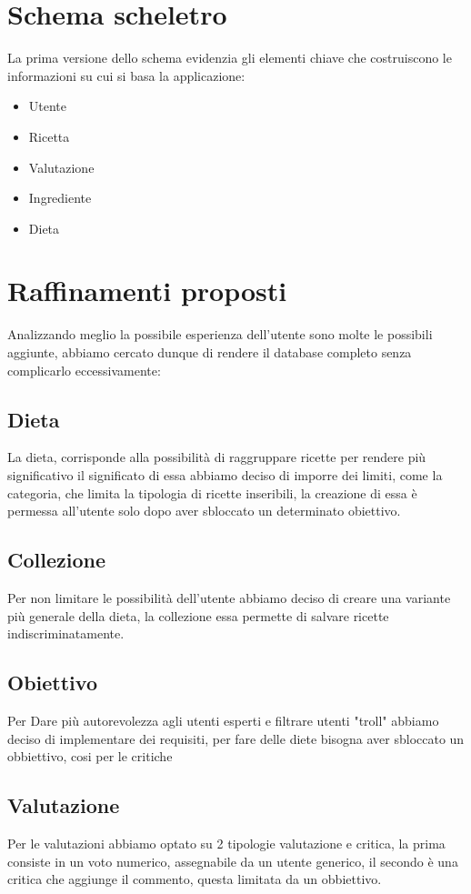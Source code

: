 ﻿\documentclass[a4paper,12pt]{report}
\begin{document}
\section{Schema scheletro}
\begin{figure}[H]
    \centering
    \label{fig:example}
\end{figure}
La prima versione dello schema evidenzia gli elementi chiave 
che costruiscono le informazioni su cui si basa la applicazione:
\begin{itemize}
    \item Utente
    \item Ricetta
    \item Valutazione
    \item Ingrediente
    \item Dieta
\end{itemize}

\section{Raffinamenti proposti}
Analizzando meglio la possibile esperienza dell'utente
sono molte le possibili aggiunte, abbiamo cercato
dunque di rendere il database completo senza complicarlo eccessivamente:
\subsection{Dieta}
La dieta, corrisponde alla possibilità di raggruppare ricette
per rendere più significativo il significato di essa abbiamo deciso di 
imporre dei limiti, come la categoria, che limita la tipologia di ricette 
inseribili, la creazione di essa è permessa all'utente solo dopo aver sbloccato un determinato obiettivo.
\subsection{Collezione}
Per non limitare le possibilità dell'utente abbiamo deciso di creare 
una variante più generale della dieta, la collezione
essa permette di salvare ricette indiscriminatamente.
\subsection{Obiettivo}
Per Dare più autorevolezza agli utenti esperti e
filtrare utenti "troll" abbiamo deciso di implementare dei requisiti,
per fare delle diete bisogna aver sbloccato un obbiettivo, 
cosi per le critiche
\subsection{Valutazione}
Per le valutazioni abbiamo optato su 2 tipologie
valutazione e critica, la prima consiste in un voto
numerico, assegnabile da un utente generico, il secondo è una critica
che aggiunge il commento, questa limitata da un obbiettivo.
\end{document}
